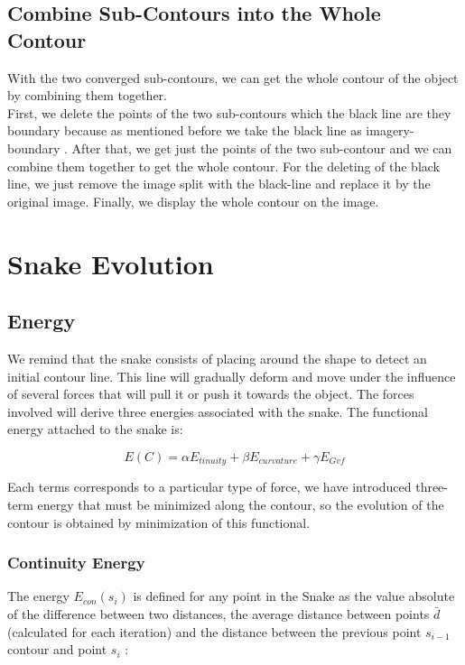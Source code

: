 \subsection{Combine Sub-Contours into the Whole Contour}\label{subsec:combine-sub-contours-into-the-whole-contour}
With the two converged sub-contours, we can get the whole contour of the object by
combining them together.\\
First, we delete the points of the two sub-contours which the black line are they
boundary because as mentioned before we take the black line as imagery-boundary .
After that, we get just the points of the two sub-contour and we can combine them
together to get the whole contour. For the deleting of the black line, we just remove
the image split with the black-line and replace it by the original image.
Finally, we display the whole contour on the image.

\section{Snake Evolution}\label{sec:snake-evolution}
\subsection{Energy}\label{subsec:energy}
We remind that the snake consists of placing around the shape to detect an initial
contour line. This line will gradually deform and move under the influence of several
forces that will pull it or push it towards the object. The forces involved will derive
three energies associated with the snake. The functional energy attached to the snake is:

\begin{equation}
    E(C) = \alpha E_{tinuity} + \beta E_{curvature} + \gamma E_{Gvf}
    \label{eq:eq3.1}
\end{equation}


\hspace{-0.6cm}Each terms corresponds to a particular type of force, we have introduced three-term
energy that must be minimized along the contour, so the evolution of the contour is
obtained by minimization of this functional.

\subsubsection{Continuity Energy}
The energy $E_{con}(s_{i})$ is defined for any point in the Snake as the value absolute of the
difference between two distances, the average distance between points $\bar{d}$
(calculated for each iteration) and the distance between the previous point $s_{i-1}$
contour and point $s_{i}$ :

